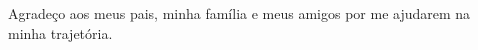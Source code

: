 \begin{agradecimentos}

Agradeço aos meus pais, minha família e meus amigos por me ajudarem na minha trajetória.

\end{agradecimentos}